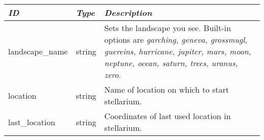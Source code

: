 \subsection{}\label{sec:config.ini:init_location}

\begin{longtabu} to \textwidth {l|l|X}\toprule
\emph{ID} & \emph{Type} & \emph{Description}\\\midrule
landscape\_name   & string & Sets the landscape you see. Built-in options are \emph{garching, geneva, grossmugl, guereins, 
                             hurricane, jupiter, mars, moon, neptune, ocean, saturn, trees, uranus, zero}.\\\midrule
location          & string & Name of location on which to start stellarium.\\\midrule
last\_location    & string & Coordinates of last used location in stellarium.\\\bottomrule
\end{longtabu}

\subsection{}\label{sec:config.ini:landscape}


